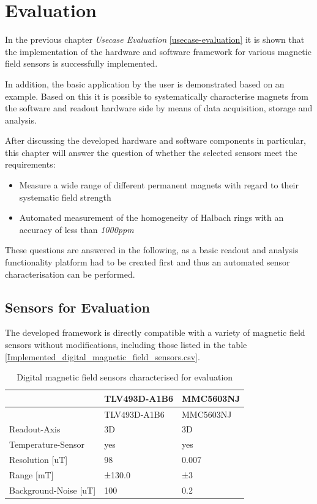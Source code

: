 \hypertarget{evaluation}{%
\chapter{Evaluation}\label{evaluation}}

In the previous chapter \emph{Usecase Evaluation}
\ref{usecase-evaluation} it is shown that the implementation of the
hardware and software framework for various magnetic field sensors is
successfully implemented.

In addition, the basic application by the user is demonstrated based on
an example. Based on this it is possible to systematically characterise
magnets from the software and readout hardware side by means of data
acquisition, storage and analysis.

After discussing the developed hardware and software components in
particular, this chapter will answer the question of whether the
selected sensors meet the requirements:

\begin{itemize}
\tightlist
\item
  Measure a wide range of different permanent magnets with regard to
  their systematic field strength
\item
  Automated measurement of the homogeneity of Halbach rings with an
  accuracy of less than \emph{1000\gls{ppm}}
\end{itemize}

These questions are answered in the following, as a basic readout and
analysis functionality platform had to be created first and thus an
automated sensor characterisation can be performed.

\hypertarget{sensors-for-evaluation}{%
\section{Sensors for Evaluation}\label{sensors-for-evaluation}}

The developed framework is directly compatible with a variety of
magnetic field sensors without modifications, including those listed in
the table \ref{Implemented_digital_magnetic_field_sensors.csv}.

\begin{longtable}[]{@{}lll@{}}
\caption{Digital magnetic field sensors characterised for evaluation
\label{Digital_magnetic_field_sensors_characterised_for_evaluation.csv}}\tabularnewline
\toprule
& TLV493D-A1B6 & MMC5603NJ\tabularnewline
\midrule
\endfirsthead
\toprule
& TLV493D-A1B6 & MMC5603NJ\tabularnewline
\midrule
\endhead
Readout-Axis & 3D & 3D\tabularnewline
Temperature-Sensor & yes & yes\tabularnewline
Resolution {[}uT{]} & 98 & 0.007\tabularnewline
Range {[}mT{]} & ±130.0 & ±3\tabularnewline
Background-Noise {[}uT{]} & 100 & 0.2\tabularnewline
\bottomrule
\end{longtable}

